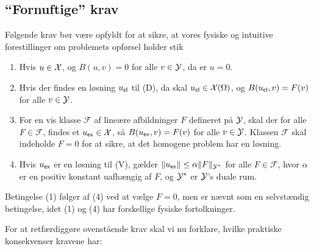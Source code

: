 \subsection{``Fornuftige'' krav}
Følgende krav bør være opfyldt for at sikre, at vores fysiske og
intuitive forestillinger om problemets opførsel holder stik
\begin{enumerate}
  \item Hvis $u \in \mathcal{X}$, og $B(u,v)=0$ for alle $v \in \mathcal{Y}$, da er
        $u=0$.
  \item Hvis der findes en løsning $u_{\mathsf{cl}}$ til (D), da skal 
        $u_{\mathsf{cl}} \in \mathcal{X} (\Omega)$, og $B(u_{\mathsf{cl}},v)=F(v)$ for alle 
        $v \in \mathcal{Y}$.    
  \item For en vis klasse $\mathcal{F}$ af lineære afbildninger $F$
        defineret på $\mathcal{Y}$, skal der for alle $F \in \mathcal{F}$,
        findes et $u_{\mathsf{ex}} \in \mathcal{X}$, så $B(u_{\mathsf{ex}},v)=F(v)$ for alle  $v \in \mathcal{Y}$.
        Klassen $\mathcal{F}$ skal indeholde $F=0$ for at sikre, at
        det homogene problem har en løsning.  
  \item Hvis $u_{\mathsf{ex}}$ er en løsning til (V), gælder 
        $\|u_{\mathsf{ex}}\| \leq \alpha \|F\|_{\mathcal{Y}^{\ast}}$ for alle
        $F\in\mathcal{F}$, hvor $\alpha$ er en positiv konstant uafhængig af
        $F$, og $\mathcal{Y}^{\ast}$ er $\mathcal{Y}$'s duale rum. 
\end{enumerate}
\begin{remark}
Betingelse (1) følger af (4) ved at vælge $F=0$, men er nævnt som en 
selv\-stæn\-dig betingelse, idet (1) og (4) har forskellige fysiske 
fortolkninger.
\end{remark}
For at retfærdiggøre ovenstående krav skal vi nu forklare, hvilke
praktiske konsekvenser kravene har:
